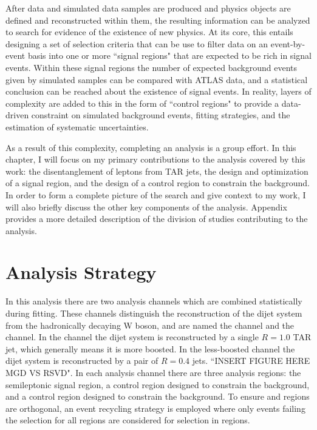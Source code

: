 \label{chapter:analysis}
After data and simulated data samples are produced and physics objects are defined and reconstructed within them, the resulting information can be analyzed to search for evidence of the existence of new physics. At its core, this entails designing a set of selection criteria that can be use to filter data on an event-by-event basis into one or more ``signal regions" that are expected to be rich in signal events. Within these signal regions the number of expected background events given by simulated samples can be compared with ATLAS data, and a statistical conclusion can be reached about the existence of signal events. In reality, layers of complexity are added to this in the form of ``control regions" to provide a data-driven constraint on simulated background events, fitting strategies, and the estimation of systematic uncertainties.

As a result of this complexity, completing an analysis is a group effort. In this chapter, I will focus on my primary contributions to the analysis covered by this work: the disentanglement of leptons from TAR jets, the design and optimization of a signal region, and the design of a control region to constrain the \ttbar background. In order to form a complete picture of the search and give context to my work, I will also briefly discuss the other key components of the analysis. Appendix ~ provides a more detailed description of the division of studies contributing to the analysis.

\section{Analysis Strategy}
\label{section:ana_strat}
In this analysis there are two analysis channels which are combined statistically during fitting. These channels distinguish the reconstruction of the dijet system from the hadronically decaying W boson, and are named the \merged channel and the \resolved channel. In the \merged channel the dijet system is reconstructed by a single $R=1.0$ TAR jet, which generally means it is more boosted. In the less-boosted \resolved channel the dijet system is reconstructed by a pair of $R=0.4$ jets. ``INSERT FIGURE HERE MGD VS RSVD". In each analysis channel there are three analysis regions: the semileptonic signal region, a control region designed to constrain the \ttbar background, and a control region designed to constrain the \wjets background. To ensure \merged and \resolved regions are orthogonal, an event recycling strategy is employed where only events failing the selection for all \merged regions are considered for selection in \resolved regions.


